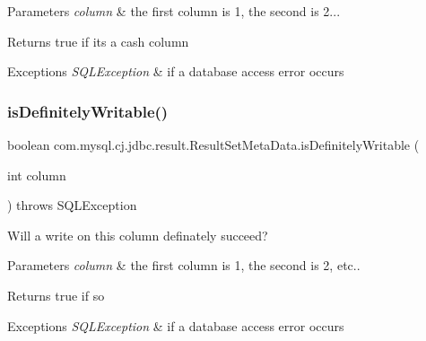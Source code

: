 \begin{DoxyParams}{Parameters}
{\em column} & the first column is 1, the second is 2...\\
\hline
\end{DoxyParams}
\begin{DoxyReturn}{Returns}
true if its a cash column
\end{DoxyReturn}

\begin{DoxyExceptions}{Exceptions}
{\em S\+Q\+L\+Exception} & if a database access error occurs \\
\hline
\end{DoxyExceptions}
\mbox{\label{classcom_1_1mysql_1_1cj_1_1jdbc_1_1result_1_1_result_set_meta_data_a093b037154dd33aa063eaea7cfde6168}} 
\subsubsection{\texorpdfstring{is\+Definitely\+Writable()}{isDefinitelyWritable()}}
{\footnotesize\ttfamily boolean com.\+mysql.\+cj.\+jdbc.\+result.\+Result\+Set\+Meta\+Data.\+is\+Definitely\+Writable (\begin{DoxyParamCaption}\item[{int}]{column }\end{DoxyParamCaption}) throws S\+Q\+L\+Exception}

Will a write on this column definately succeed?


\begin{DoxyParams}{Parameters}
{\em column} & the first column is 1, the second is 2, etc..\\
\hline
\end{DoxyParams}
\begin{DoxyReturn}{Returns}
true if so
\end{DoxyReturn}

\begin{DoxyExceptions}{Exceptions}
{\em S\+Q\+L\+Exception} & if a database access error occurs \\
\hline
\end{DoxyExceptions}
\mbox{\label{classcom_1_1mysql_1_1cj_1_1jdbc_1_1result_1_1_result_set_meta_data_aa43c80c47922375a72afe54e7a56c865}} 
